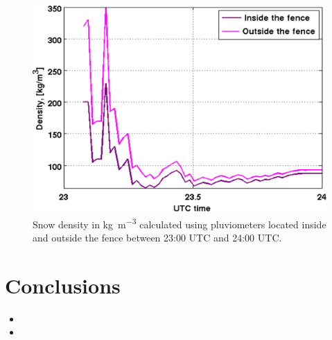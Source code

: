 \documentclass[portrait,a0]{a0poster}
\begin{document}
\begin{multicols}{3}
\begin{figure}[H]
  \centering
    \includegraphics[width=0.7\columnwidth]{density}
  \caption{Snow density in \si{\kilo\g\per\cubic\metre} calculated using pluviometers located inside and outside the fence between 23:00 UTC and 24:00 UTC.}
  \label{fig:sounding}
\end{figure}

\section{Conclusions}

\begin{itemize}
\item \lipsum[4]
\item \lipsum[5]
\end{itemize}




\end{multicols}

\vfill %

\begin{minipage}[t]{0.9\linewidth} %
\footnotesize
{}

\end{minipage}
\end{document}
